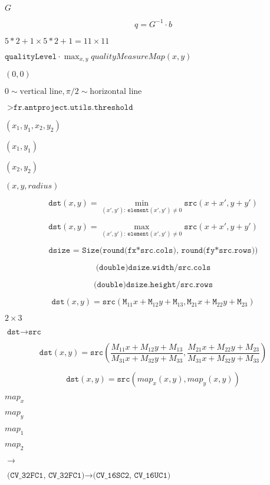 \documentclass{article}
\begin{document}
$G$
\pagebreak

\[q = G^{-1} \cdot b\]
\pagebreak

$5*2+1 \times 5*2+1 = 11 \times 11$
\pagebreak

$\texttt{qualityLevel} \cdot \max_{x,y} qualityMeasureMap(x,y)$
\pagebreak

$(0,0)$
\pagebreak

$0 \sim \textrm{vertical line}, \pi/2 \sim \textrm{horizontal line}$
\pagebreak

$>\texttt{fr.antproject.utils.threshold}$
\pagebreak

$(x_1, y_1, x_2, y_2)$
\pagebreak

$(x_1,y_1)$
\pagebreak

$(x_2, y_2)$
\pagebreak

$(x, y, radius)$
\pagebreak

\[\texttt{dst} (x,y) = \min _{(x',y'): \, \texttt{element} (x',y') \ne0 } \texttt{src} (x+x',y+y')\]
\pagebreak

\[\texttt{dst} (x,y) = \max _{(x',y'): \, \texttt{element} (x',y') \ne0 } \texttt{src} (x+x',y+y')\]
\pagebreak

\[\texttt{dsize = Size(round(fx*src.cols), round(fy*src.rows))}\]
\pagebreak

\[\texttt{(double)dsize.width/src.cols}\]
\pagebreak

\[\texttt{(double)dsize.height/src.rows}\]
\pagebreak

\[\texttt{dst} (x,y) = \texttt{src} ( \texttt{M} _{11} x + \texttt{M} _{12} y + \texttt{M} _{13}, \texttt{M} _{21} x + \texttt{M} _{22} y + \texttt{M} _{23})\]
\pagebreak

$2\times 3$
\pagebreak

$\texttt{dst}\rightarrow\texttt{src}$
\pagebreak

\[\texttt{dst} (x,y) = \texttt{src} \left ( \frac{M_{11} x + M_{12} y + M_{13}}{M_{31} x + M_{32} y + M_{33}} , \frac{M_{21} x + M_{22} y + M_{23}}{M_{31} x + M_{32} y + M_{33}} \right )\]
\pagebreak

\[\texttt{dst} (x,y) = \texttt{src} (map_x(x,y),map_y(x,y))\]
\pagebreak

$map_x$
\pagebreak

$map_y$
\pagebreak

$map_1$
\pagebreak

$map_2$
\pagebreak

$\rightarrow$
\pagebreak

$\texttt{(CV_32FC1, CV_32FC1)} \rightarrow \texttt{(CV_16SC2, CV_16UC1)}$
\pagebreak
\end{document}
